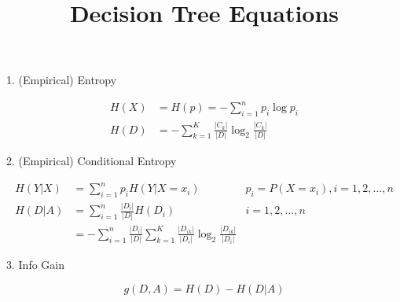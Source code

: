 \documentclass[12pt]{article}
\title{Decision Tree Equations}
\begin{document}
\maketitle

1. (Empirical) Entropy

\begin{align*}
  H(X) &= H(p) = -\sum_{i=1}^{n} p_i \log p_i \\
  H(D) &= -\sum_{k=1}^K \frac{|C_k|}{|D|} \log_2\frac{|C_k|}{|D|}
\end{align*}

2. (Empirical) Conditional Entropy


\begin{align*}
  H(Y|X)&=\sum_{i=1}^n p_i H(Y|X=x_i)  & p_i=P(X=x_i),i=1,2,\dots ,n \\
  H(D|A)&=\sum_{i=1}^n \frac{|D_i|}{|D|} H(D_i)  & i=1,2,\dots ,n \\
        &=-\sum_{i=1}^n \frac{|D_i|}{|D|} \sum_{k=1}^K \frac{|D_{ik}|}{|D_i|} \log_2\frac{|D_{ik}|}{|D_i|}
\end{align*}

3. Info Gain

$$ g(D,A) = H(D) - H(D|A) $$
\end{document}
